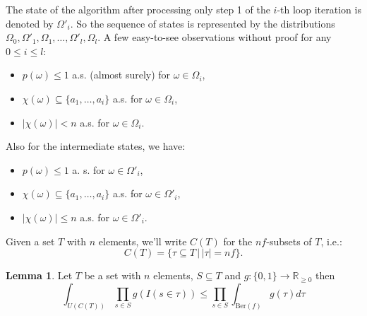 \documentclass{article}
\theoremstyle{definition}
\newtheorem{lemma}{Lemma}
\begin{document}
The state of the algorithm after processing only step 1 of the $i$-th loop iteration is denoted by $\Omega'_i$.
So the sequence of states is represented by the distributions $\Omega_0, \Omega'_1, \Omega_1, \ldots, \Omega'_l, \Omega_l$.
A few easy-to-see observations without proof for any $0 \leq i \leq l$:
\begin{itemize}
\item $p(\omega) \leq 1$ a.s. (almost surely) for $\omega \in \Omega_i$,
\item $\chi(\omega) \subseteq \{a_1,\ldots,a_i\}$ a.s. for $\omega \in \Omega_i$,
\item $|\chi(\omega)| < n$ a.s. for $\omega \in \Omega_i$.
\end{itemize}
Also for the intermediate states, we have:
\begin{itemize}
\item $p(\omega) \leq 1$ a. s. for $\omega \in \Omega'_i$,
\item $\chi(\omega) \subseteq \{a_1,\ldots,a_i\}$ a.s. for $\omega \in \Omega'_i$,
\item $|\chi(\omega)| \leq n$ a.s. for $\omega \in \Omega'_i$.
\end{itemize}
Given a set $T$ with $n$ elements, we'll write $C(T)$ for the $nf$-subsets of $T$, i.e.:
\[
  C(T) = \{ \tau \subseteq T \, | \, |\tau| = nf \} \textrm{.}
\]
\begin{lemma}\label{le:samp_prod}
Let $T$ be a set with $n$ elements, $S \subseteq T$ and $g: \{0,1\} \rightarrow \mathbb R_{\geq 0}$ then
\[
  \int_{U(C(T))} \prod_{s \in S} g(I(s \in \tau)) \leq \prod_{s \in S} \int_{\mathrm{Ber}(f)} g(\tau) d \tau
\]
\end{lemma}
\end{document}
